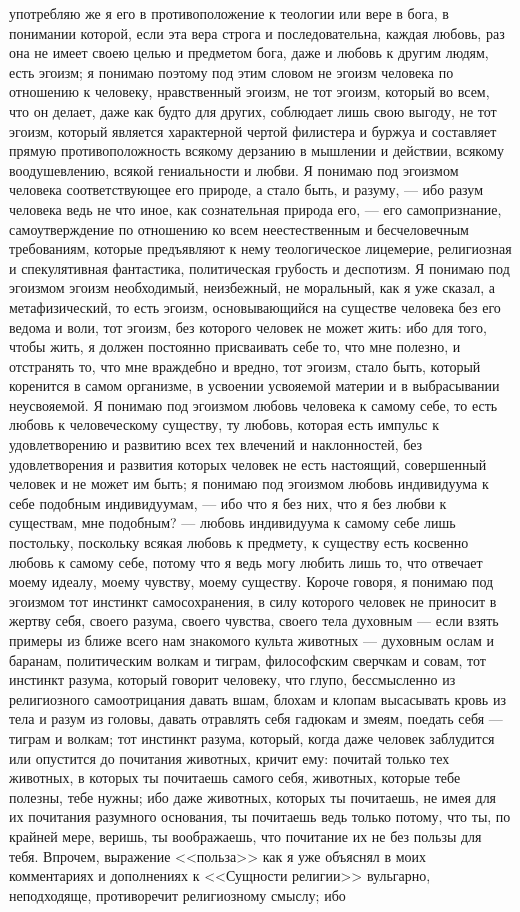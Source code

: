 \documentclass[12pt]{article}
\begin{document}
употребляю же я его в противоположение к теологии или вере в бога, в понимании которой, если эта вера строга и последовательна, каждая любовь, раз она не имеет своею целью и предметом бога, даже и любовь к другим людям, есть эгоизм; я понимаю поэтому под этим словом не эгоизм человека по отношению к человеку, нравственный эгоизм, не тот эгоизм, который во всем, что он делает, даже как будто для других, соблюдает лишь свою выгоду, не тот эгоизм, который является характерной чертой филистера и буржуа и составляет прямую противоположность всякому дерзанию в мышлении и действии, всякому воодушевлению, всякой гениальности и любви. Я понимаю под эгоизмом человека соответствующее его природе, а стало быть, и разуму, --- ибо разум человека ведь не что иное, как сознательная природа его, --- его самопризнание, самоутверждение по отношению ко всем неестественным и бесчеловечным требованиям, которые предъявляют к нему теологическое лицемерие, религиозная и спекулятивная фантастика, политическая грубость и деспотизм. Я понимаю под эгоизмом эгоизм необходимый, неизбежный, не моральный, как я уже сказал, а метафизический, то есть эгоизм, основывающийся на существе человека без его ведома и воли, тот эгоизм, без которого человек не может жить: ибо для того, чтобы жить, я должен постоянно присваивать себе то, что мне полезно, и отстранять то, что мне враждебно и вредно, тот эгоизм, стало быть, который коренится в самом организме, в усвоении усвояемой материи и в выбрасывании неусвояемой. Я понимаю под эгоизмом любовь человека к самому себе, то есть любовь к человеческому существу, ту любовь, которая есть импульс к удовлетворению и развитию всех тех влечений и наклонностей, без удовлетворения и развития которых человек не есть настоящий, совершенный человек и не может им быть; я понимаю под эгоизмом любовь индивидуума к себе подобным индивидуумам, --- ибо что я без них, что я без любви к существам, мне подобным? --- любовь индивидуума к самому себе лишь постольку, поскольку всякая любовь к предмету, к существу есть косвенно любовь к самому себе, потому что я ведь могу любить лишь то, что отвечает моему идеалу, моему чувству, моему существу. Короче говоря, я понимаю под эгоизмом тот инстинкт самосохранения, в силу которого человек не приносит в жертву себя, своего разума, своего чувства, своего тела духовным --- если взять примеры из ближе всего нам знакомого культа животных --- духовным ослам и баранам, политическим волкам и тиграм, философским сверчкам и совам, тот инстинкт разума, который говорит человеку, что глупо, бессмысленно из религиозного самоотрицания давать вшам, блохам и клопам высасывать кровь из тела и разум из головы, давать отравлять себя гадюкам и змеям, поедать себя --- тиграм и волкам; тот инстинкт разума, который, когда даже человек заблудится или опустится до почитания животных, кричит ему: почитай только тех животных, в которых ты почитаешь самого себя, животных, которые тебе полезны, тебе нужны; ибо даже животных, которых ты почитаешь, не имея для их почитания разумного основания, ты почитаешь ведь только потому, что ты, по крайней мере, веришь, ты воображаешь, что почитание их не без пользы для тебя. Впрочем, выражение <<польза>> как я уже объяснял в моих комментариях и дополнениях к <<Сущности религии>>  вульгарно, неподходяще, противоречит религиозному смыслу; ибо 
\end{document}

